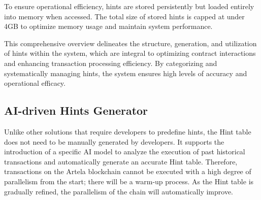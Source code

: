 To ensure operational efficiency, hints are stored persistently but loaded entirely into memory when accessed. The total size of stored hints is capped at under 4GB to optimize memory usage and maintain system performance.

This comprehensive overview delineates the structure, generation, and utilization of hints within the system, which are integral to optimizing contract interactions and enhancing transaction processing efficiency. By categorizing and systematically managing hints, the system ensures high levels of accuracy and operational efficacy.

\subsection{AI-driven Hints Generator}

Unlike other solutions that require developers to predefine hints, the Hint table does not need to be manually generated by developers. It supports the introduction of a specific AI model to analyze the execution of past historical transactions and automatically generate an accurate Hint table. Therefore, transactions on the Artela blockchain cannot be executed with a high degree of parallelism from the start; there will be a warm-up process. As the Hint table is gradually refined, the parallelism of the chain will automatically improve.